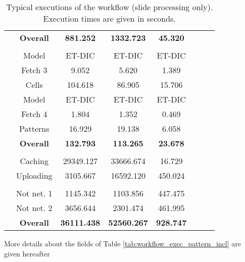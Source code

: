 \begin{table}
\begin{tabular}{|c|c|c|c|c|c|c|c|}
	 & \textbf{Overall} & \textbf{881.252} & \textbf{1332.723} & \textbf{45.320} \\
	 &  &  &  &  \\
	 \parbox[t]{2mm}{} & Model & ET-DIC & ET-DIC & ET-DIC \\
	 & Fetch 3 & 9.052 & 5.620 & 1.389 \\
	 & Cells & 104.618 & 86.905 & 15.706 \\
	 & Model & ET-DIC & ET-DIC & ET-DIC \\
	 & Fetch 4 & 1.804 & 1.352 & 0.469 \\
	 & Patterns & 16.929 & 19.138 & 6.058 \\
	 & \textbf{Overall} & \textbf{132.793} & \textbf{113.265} & \textbf{23.678} \\
	 &  &  &  &  \\
	 \parbox[t]{2mm}{} & Caching & 29349.127 & 33666.674 & 16.729 \\
	 & Uploading & 3105.667 & 16592.120 & 450.024 \\
	 &  &  &  &  \\
	 \parbox[t]{2mm}{} & Not net. 1 & 1145.342 & 1103.856 & 447.475 \\
	 & Not net. 2 & 3656.644 & 2301.474 & 461.995 \\
	 & \textbf{Overall} & \textbf{36111.438} & \textbf{52560.267} & \textbf{928.747} \\
	\hline
	\end{tabular}
	\caption{Typical executions of the workflow (slide processing only). Execution times are given in seconds.}
	\label{tab:perf_time_typical}
\end{table}


More details about the fields of Table \ref{tab:workflow_exec_pattern_incl} are given hereafter

